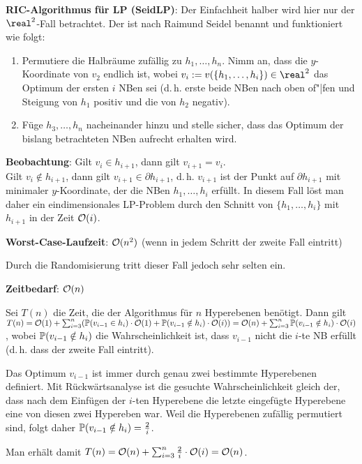 \textbf{RIC-Algorithmus für LP (SeidLP)}:
Der Einfachheit halber wird hier nur der $\real^2$-Fall betrachtet.
Der  ist nach Raimund Seidel benannt und funktioniert wie folgt:
\begin{enumerate}
    \item
    Permutiere die Halbräume zufällig zu $h_1, \dotsc, h_n$.
    Nimm an, dass die $y$-Koordinate von $v_2$ endlich ist,
    wobei $v_i := v(\{h_1, \dotsc, h_i\}) \in \real^2$ das Optimum der ersten $i$ NBen sei
    (d.\,h. erste beide NBen nach oben of"|fen und Steigung von $h_1$ positiv und die von
    $h_2$ negativ).
    
    \item
    Füge $h_3, \dotsc, h_n$ nacheinander hinzu und stelle sicher, dass das Optimum der bislang
    betrachteten NBen aufrecht erhalten wird.
\end{enumerate}

\textbf{Beobachtung}:
Gilt $v_i \in h_{i+1}$, dann gilt $v_{i+1} = v_i$.\\
Gilt $v_i \notin h_{i+1}$, dann gilt $v_{i+1} \in \partial h_{i+1}$,
d.\,h. $v_{i+1}$ ist der Punkt auf $\partial h_{i+1}$ mit minimaler $y$-Koordinate,
der die NBen $h_1, \dotsc, h_i$ erfüllt.
In diesem Fall löst man daher ein eindimensionales LP-Problem durch den Schnitt von
$\{h_1, \dotsc, h_i\}$ mit $h_{i+1}$ in der Zeit $\mathcal{O}(i)$.

\linie

\textbf{Worst-Case-Laufzeit}:
$\mathcal{O}(n^2)$
(wenn in jedem Schritt der zweite Fall eintritt)

Durch die Randomisierung tritt dieser Fall jedoch sehr selten ein.

\textbf{Zeitbedarf}:
$\mathcal{O}(n)$

\begin{Beweis}
    Sei $T(n)$ die Zeit, die der Algorithmus für $n$ Hyperebenen benötigt.
    Dann gilt\\
    $T(n) = \mathcal{O}(1) +
    \sum_{i=3}^n (\mathbb{P}(v_{i-1} \in h_i) \cdot \mathcal{O}(1) + \mathbb{P}(v_{i-1} \notin h_i) \cdot \mathcal{O}(i))
    = \mathcal{O}(n) + \sum_{i=3}^n \mathbb{P}(v_{i-1} \notin h_i) \cdot \mathcal{O}(i)$,
    wobei $\mathbb{P}(v_{i-1} \notin h_i)$ die Wahrscheinlichkeit ist, dass $v_{i-1}$ nicht die
    $i$-te NB erfüllt (d.\,h. dass der zweite Fall eintritt).
    
    Das Optimum $v_{i-1}$ ist immer durch genau zwei bestimmte Hyperebenen definiert.
    Mit Rückwärtsanalyse ist die gesuchte Wahrscheinlichkeit gleich der, dass
    nach dem Einfügen der $i$-ten Hyperebene die letzte eingefügte Hyperebene eine von diesen
    zwei Hypereben war.
    Weil die Hyperebenen zufällig permutiert sind, folgt daher
    $\mathbb{P}(v_{i-1} \notin h_i) = \frac{2}{i}$.
    
    Man erhält damit $T(n) = \mathcal{O}(n) + \sum_{i=3}^n \frac{2}{i} \cdot \mathcal{O}(i) = \mathcal{O}(n)$.
\end{Beweis}

